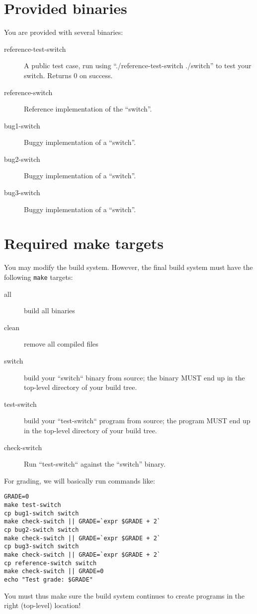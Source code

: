 \documentclass{article}
\begin{document}
\section{Provided binaries} \label{sec:binaries}

You are provided with several binaries:

\begin{description}
\item[reference-test-switch] A public test case, run using ``./reference-test-switch ./switch''
  to test your switch. Returns 0 on success.
\item[reference-switch] Reference implementation of the ``switch''.
\item[bug1-switch] Buggy implementation of a ``switch''.
\item[bug2-switch] Buggy implementation of a ``switch''.
\item[bug3-switch] Buggy implementation of a ``switch''.
\end{description}

\newpage
\section{Required make targets}

You may modify the build system. However, the final build system must
have the following {\tt make} targets:

\begin{description}
\item[all] build all binaries
\item[clean] remove all compiled files
\item[switch] build your ``switch`` binary from source; the binary MUST end up in the top-level directory of your build tree.
\item[test-switch] build your ``test-switch`` program from source; the program MUST end up in the top-level directory of your build tree.
\item[check-switch] Run ``test-switch`` against the ``switch'' binary.
\end{description}

For grading, we will basically run commands like:
\begin{verbatim}
GRADE=0
make test-switch
cp bug1-switch switch
make check-switch || GRADE=`expr $GRADE + 2`
cp bug2-switch switch
make check-switch || GRADE=`expr $GRADE + 2`
cp bug3-switch switch
make check-switch || GRADE=`expr $GRADE + 2`
cp reference-switch switch
make check-switch || GRADE=0
echo "Test grade: $GRADE"
\end{verbatim}

You must thus make sure the build system continues to create programs
in the right (top-level) location!
\end{document}
